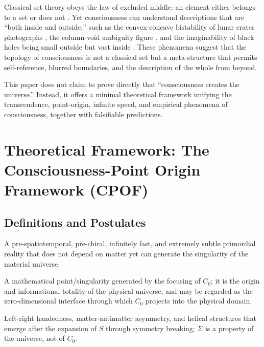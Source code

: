 \documentclass[11pt,a4paper]{article}
\begin{document}
Classical set theory obeys the law of excluded middle: an element either belongs to a set or does not \cite{lix2026language}. Yet consciousness can understand descriptions that are ``both inside and outside,'' such as the convex-concave bistability of lunar crater photographs \cite{leopold1999}, the column-void ambiguity figure \cite{ramachandran2011}, and the imaginability of black holes being small outside but vast inside \cite{lix2026point}. These phenomena suggest that the topology of consciousness is not a classical set but a meta-structure that permits self-reference, blurred boundaries, and the description of the whole from beyond.

This paper does not claim to prove directly that ``consciousness creates the universe.'' Instead, it offers a minimal theoretical framework unifying the transcendence, point-origin, infinite speed, and empirical phenomena of consciousness, together with falsifiable predictions.

\section{Theoretical Framework: The Consciousness-Point Origin Framework (CPOF)}

\subsection{Definitions and Postulates}

\begin{definition}
A pre-spatiotemporal, pre-chiral, infinitely fast, and extremely subtle primordial reality that does not depend on matter yet can generate the singularity of the material universe.
\end{definition}

\begin{definition}
A mathematical point/singularity generated by the focusing of $C_0$; it is the origin and informational totality of the physical universe, and may be regarded as the zero-dimensional interface through which $C_0$ projects into the physical domain.
\end{definition}

\begin{definition}
Left-right handedness, matter-antimatter asymmetry, and helical structures that emerge after the expansion of $S$ through symmetry breaking; $\Sigma$ is a property of the universe, not of $C_0$.
\end{definition}
\end{document}

